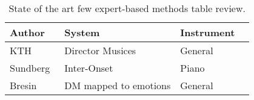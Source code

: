 \begin{table}[ht!]
\centering

  \begin{tabular}{  l l l l }
    \hline
	Author & System & Instrument \\ \hline
    KTH~\cite{Friberg2009}& Director Musices & General\\
    Sundberg~\cite{Sundberg2003} & Inter-Onset & Piano\\
    Bresin~\cite{Bresin1998}~\cite{Bresin2000} & DM mapped to emotions & General\\
    \hline
  \end{tabular}

  \caption{State of the art few expert-based methods table review.}
  \label{tab:sota_experts}

\end{table}
